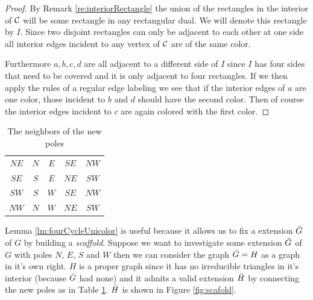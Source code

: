 \begin{proof}
By Remark \ref{re:interiorRectangle} the union of the rectangles in the interior of $\mathcal{C}$ will be some rectangle in any rectangular dual. We will denote this rectangle by $I$. Since two disjoint rectangles can only be adjacent to each other at one side all interior edges incident to any vertex of $\mathcal{C}$ are of the same color.

Furthermore $a, b, c, d$ are all adjacent to a different side of $I$ since $I$ has four sides that need to be covered and it is only adjacent to four rectangles. If we then apply the rules of a regular edge labeling we see that if the interior edges of $a$ are one color, those incident to $b$ and $d$ should have the second color. Then of course the interior edges incident to $c$ are again colored with the first color.

\end{proof}


\begin{table}
  \centering
  \begin{tabular}{c|| c c c c}
    $NE$ & $N$ & $ E$ & $ SE$ & $ NW$ \\
    $SE$ & $S$ & $ E$ & $ NE$ & $ SW$\\
    $SW$ & $S$ & $ W$ & $ SE$ & $ NW$\\
    $NW$ & $N$ & $ W$ & $ NE$ & $ SW$\\
  \end{tabular}
  \caption{The neighbors of the new poles}
  \label{tab:scaffold}
\end{table}

Lemma \ref{lm:fourCycleUnicolor} is useful because it allows us to fix a extension $\bar{G}$ of $G$ by building a \emph{scaffold}. Suppose we want to investigate some extension $\bar{G}$ of $G$ with poles $N$, $E$, $S$ and $W$ then we can consider the graph $\bar{G} = H$ as a graph in it's own right. $H$ is a proper graph since it has no irreducible triangles in it's interior (because $\bar{G}$ had none) and it admits a valid extension $\bar{H}$ by connecting the new poles as in Table \ref{tab:scaffold}. $\bar{H}$ is shown in Figure \ref{fig:scafold}.

